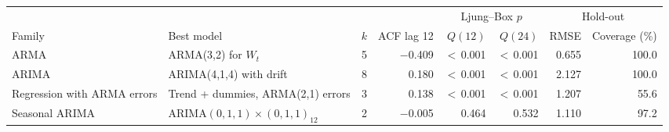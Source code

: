 \begin{tabular}{llrrrrrr}
\toprule
 & & & & \multicolumn{2}{c}{Ljung--Box $p$} & \multicolumn{2}{c}{Hold-out}\\
\cmidrule(lr){5-6}\cmidrule(lr){7-8}
Family & Best model & $k$ & ACF lag 12 & $Q(12)$ & $Q(24)$ & RMSE & Coverage (\%)\\
\midrule
ARMA & ARMA(3,2) for $W_t$ & 5 & $-$0.409 & $<$\,0.001 & $<$\,0.001 & 0.655 & 100.0\\
ARIMA & ARIMA(4,1,4) with drift & 8 & 0.180 & $<$\,0.001 & $<$\,0.001 & 2.127 & 100.0\\
Regression with ARMA errors & Trend + dummies, ARMA(2,1) errors & 3 & 0.138 & $<$\,0.001 & $<$\,0.001 & 1.207 & 55.6\\
Seasonal ARIMA & ARIMA$(0,1,1)\times(0,1,1)_{12}$ & 2 & $-$0.005 & 0.464 & 0.532 & 1.110 & 97.2\\
\bottomrule
\end{tabular}
